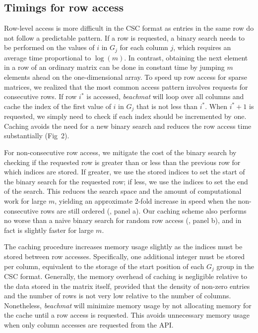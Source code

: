 \documentclass{article}
\newcommand{\beachmat}{\textit{beachmat}}
\begin{document}
\subsection{Timings for row access}
Row-level access is more difficult in the CSC format as entries in the same row do not follow a predictable pattern.
If a row is requested, a binary search needs to be performed on the values of $i$ in $G_j$ for each column $j$, which requires an average time proportional to $\log(m)$.
In contrast, obtaining the next element in a row of an ordinary matrix can be done in constant time by jumping $m$ elements ahead on the one-dimensional array.
To speed up row access for sparse matrices, we realized that the most common access pattern involves requests for consecutive rows.
If row $i^*$ is accessed, \beachmat{} will loop over all columns and cache the index of the first value of $i$ in $G_j$ that is not less than $i^*$.
When $i^*+1$ is requested, we simply need to check if each index should be incremented by one.
Caching avoids the need for a new binary search and reduces the row access time substantially (Fig~2).


For non-consecutive row access, we mitigate the cost of the binary search by checking if the requested row is greater than or less than the previous row for which indices are stored.
If greater, we use the stored indices to set the start of the binary search for the requested row; if less, we use the indices to set the end of the search. 
This reduces the search space and the amount of computational work for large $m$, yielding an approximate 2-fold increase in speed when the non-consecutive rows are still ordered (\suppfigsparserandom{}, panel a).
Our caching scheme also performs no worse than a naive binary search for random row access (\suppfigsparserandom{}, panel b), and in fact is slightly faster for large $m$.

The caching procedure increases memory usage slightly as the indices must be stored between row accesses.
Specifically, one additional integer must be stored per column, equivalent to the storage of the start position of each $G_j$ group in the CSC format.
Generally, the memory overhead of caching is negligible relative to the data stored in the matrix itself, provided that the density of non-zero entries and the number of rows is not very low relative to the number of columns.
Nonetheless, \beachmat{} will minimize memory usage by not allocating memory for the cache until a row access is requested.
This avoids unnecessary memory usage when only column accesses are requested from the API.
\end{document}
